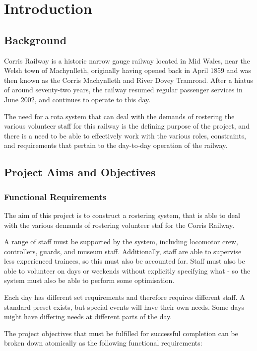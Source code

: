 \chapter{Introduction}

\section{Background}
Corris Railway is a historic narrow gauge railway located in Mid Wales, near the Welsh town of Machynlleth, originally having opened back in April 1859 and was then known as the Corris Machynlleth and River Dovey Tramroad. \cite{DEVEREAUX01} After a hiatus of around seventy-two years, the railway resumed regular passenger services in June 2002, and continues to operate to this day. \cite{CORRISSOCIETY1}

The need for a rota system that can deal with the demands of rostering the various volunteer staff for this railway is the defining purpose of the project, and there is a need to be able to effectively work with the various roles, constraints, and requirements that pertain to the day-to-day operation of the railway. 

\section{Project Aims and Objectives}
\subsection{Functional Requirements}
The aim of this project is to construct a rostering system, that is able to deal with the various demands of rostering volunteer staf for the Corris Railway. 

A range of staff must be supported by the system, including locomotor crew, controllers, guards, and museum staff. Additionally, staff are able to supervise less experienced trainees, so this must also be accounted for. Staff must also be able to volunteer on days or weekends without explicitly specifying what - so the system must also be able to perform some optimisation.

Each day has different set requirements and therefore requires different staff. A standard preset exists, but special events will have their own needs. Some days might have differing needs at different parts of the day.

The project objectives that must be fulfilled for successful completion can be broken down atomically as the following functional requirements:

